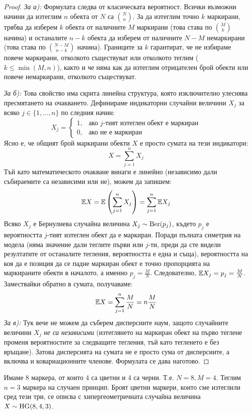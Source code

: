 \begin{proof}
\emph{За а):} Формулата следва от класическата вероятност. Всички възможни начини да изтеглим $n$ обекта от $N$ са $\binom{N}{n}$. За да изтеглим точно $k$ маркирани, трябва да изберем $k$ обекта от наличните $M$ маркирани (това става по $\binom{M}{k}$ начина) и останалите $n-k$ обекта да изберем от наличните $N-M$ немаркирани (това става по $\binom{N-M}{n-k}$ начина). Границите за $k$ гарантират, че не избираме повече маркирани, отколкото съществуват или отколкото теглим ($k \le \min(M, n)$), както и че няма как да изтеглим отрицателен брой обекти или повече немаркирани, отколкото съществуват.

\emph{За б):} Това свойство има скрита линейна структура, която изключително улеснява пресмятането на очакването. Дефинираме индикаторни случайни величини $X_j$ за всяко $j \in \{1, \dots, n\}$ по следния начин:
\[
X_j = \begin{cases}
1, & \text{ако } j\text{-тият изтеглен обект е маркиран} \\
0, & \text{ако не е маркиран}
\end{cases}
\]
Ясно е, че общият брой маркирани обекти $X$ е просто сумата на тези индикатори:
\[
X = \sum_{j=1}^n X_j
\]
Тъй като математическото очакване винаги е линейно (независимо дали събираемите са независими или не), можем да запишем:
\[
\mathbb{E} X = \mathbb{E}\left(\sum_{j=1}^n X_j\right) = \sum_{j=1}^n \mathbb{E} X_j
\]
Всяко $X_j$ е Бернулиева случайна величина $X_j \sim \operatorname{Ber}(p_j)$, където $p_j$ е вероятността $j$-тият изтеглен обект да е маркиран. Поради пълната симетрия на модела (няма значение дали теглите първи или $j$-ти, преди да сте видели резултатите от останалите тегления, вероятността е една и съща), вероятността на коя да е позиция да се падне маркиран обект е точно пропорцията на маркираните обекти в началото, а именно $p_j = \frac{M}{N}$.
Следователно, $\mathbb{E} X_j = p_j = \frac{M}{N}$. Замествайки обратно в сумата, получаваме:
\[
\mathbb{E} X = \sum_{j=1}^n \frac{M}{N} = n \frac{M}{N}
\]
\emph{За в):} Тук вече не можем да съберем дисперсиите наум, защото случайните величини $X_j$ \emph{не са независими} (изтеглянето на маркиран обект на първо теглене променя вероятностите за следващите тегления, тъй като тегленето е без връщане). Затова дисперсията на сумата не е просто сума от дисперсиите, а включва и ковариационните членове. Формулата се дава наготово.

\end{proof}

\begin{example}\label{ex:07-1}
Имаме 8 маркера, от които 4 са цветни и 4 са черни. Т.е. $N = 8, M = 4$. Теглим $n = 3$ маркера на случаен принцип. Броят цветни маркери, които сме изтеглили сред тези три, се описва с хипергеометричната случайна величина $X \sim \operatorname{HG}(8, 4, 3)$.
\end{example}


